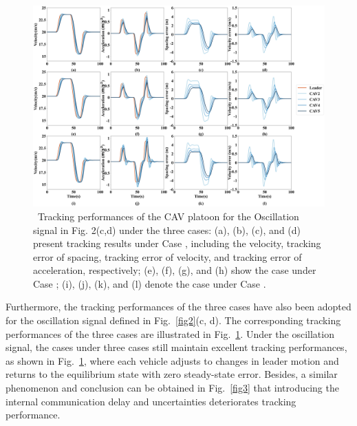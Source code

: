 \documentclass[a4paper]{cas-sc}
\begin{document}
\begin{figure}
  \centering
  \includegraphics[width=14cm]{figs/fig4.png}
  \caption{~Tracking performances of the CAV platoon for the Oscillation signal in Fig. 2(c,d) under the three cases: (a), (b), (c), and (d) present tracking results under Case \uppercase\expandafter{}, including the velocity, tracking error of spacing, tracking error of velocity, and tracking error of acceleration, respectively; (e), (f), (g), and (h) show the case under Case  \uppercase\expandafter{}; (i), (j), (k), and (l) denote the case under Case \uppercase\expandafter{}.}
  \label{fig4}
\end{figure}

Furthermore, the tracking performances of the three cases have also been adopted for the oscillation signal defined in Fig.~\ref{fig2}(c, d). The corresponding tracking performances of the three cases are illustrated in Fig.~\ref{fig4}. Under the oscillation signal, the cases under three cases still maintain excellent tracking performances, as shown in Fig.~\ref{fig4}, where each vehicle adjusts to changes in leader motion and returns to the equilibrium state with zero steady-state error. Besides, a similar phenomenon and conclusion can be obtained in Fig.~\ref{fig3} that introducing the internal communication delay and uncertainties deteriorates tracking performance.
\end{document}
